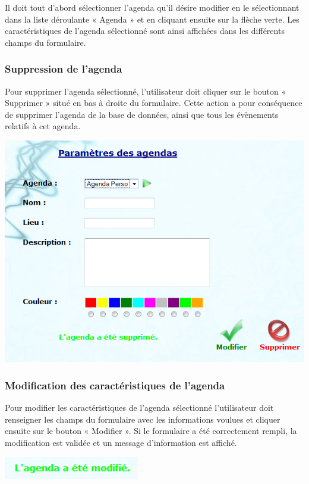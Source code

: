 \documentclass[12pt , a4paper]{article}
\begin{document}
\noindent Il doit tout d’abord sélectionner l’agenda qu’il désire modifier en le sélectionnant dans la liste
déroulante « Agenda » et en cliquant ensuite sur la flèche verte. Les caractéristiques de l’agenda
sélectionné sont ainsi affichées dans les différents champs du formulaire.

\subsubsection{Suppression de l'agenda}
\noindent Pour supprimer l’agenda sélectionné, l’utilisateur doit cliquer sur le bouton « Supprimer » situé
en bas à droite du formulaire. Cette action a pour conséquence de supprimer l’agenda de la
base de données, ainsi que tous les évènements relatifs à cet agenda.
\begin{center}
  \includegraphics[scale=0.6]{./images/param_agenda1.png}
\end{center}

\subsubsection{Modification des caractéristiques de l'agenda}
\noindent Pour modifier les caractéristiques de l’agenda sélectionné l’utilisateur doit renseigner les
champs du formulaire avec les informations voulues et cliquer ensuite sur le bouton
« Modifier ». Si le formulaire a été correctement rempli, la modification est validée et un
message d’information est affiché.

\begin{center}
  \includegraphics[scale=0.6]{./images/modif_agenda.png}
\end{center}
\end{document}
